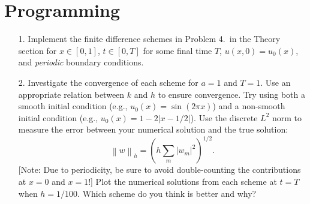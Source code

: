 \documentclass{article}
\begin{document}
\section{Programming}

\begin{itemize}
\item[1.] Implement the finite difference schemes in Problem 4.\ in the Theory section for $x \in [0,1]$, $t \in [0,T]$ for some final time $T$, $u(x,0) = u_0(x)$, and \emph{periodic} boundary conditions.
\item[2.] Investigate the convergence of each scheme for $a = 1$ and $T = 1$. Use an appropriate relation between $k$ and $h$ to ensure convergence. Try using both a smooth initial condition (e.g., $u_0(x) = \sin(2 \pi x)$) and a non-smooth initial condition (e.g., $u_0(x) = 1 - 2 \lvert x - 1/2 \rvert$). Use the discrete $L^2$ norm to measure the error between your numerical solution and the true solution:
\begin{equation*}
\left\lVert w \right\rVert_h = \left( h \sum_m \left\lvert w_m \right\rvert^2 \right)^{1/2}.
\end{equation*}
[Note: Due to periodicity, be sure to avoid double-counting the contributions at $x = 0$ and $x = 1$!] Plot the numerical solutions from each scheme at $t = T$ when $h = 1/100$. Which scheme do you think is better and why?
\end{itemize}
\end{document}
